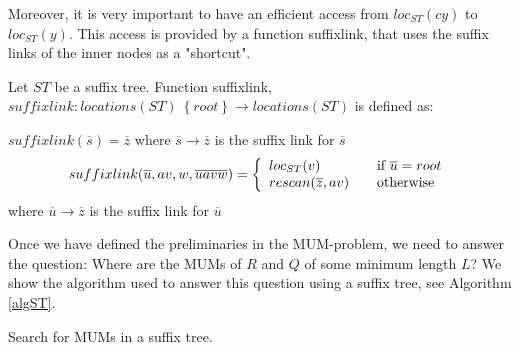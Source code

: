 \documentclass[conference]{IEEEtran}
\begin{document}
Moreover, it is very important to have an efficient access from $loc_{ST}(cy)$ to $loc_{ST}(y)$. This access is provided by a function suffixlink, that uses the suffix links of the inner nodes as a "shortcut".
\begin{mydef}
Let $ST$ be a suffix tree. Function suffixlink, $suffixlink:locations(ST)\ \left\lbrace root\right\rbrace\rightarrow locations(ST)$ is defined as:
\begin{center}
$suffixlink(\overline{s})=\overline{z}$
where $\overline{s}\rightarrow\overline{z}$ is the suffix link for $\overline{s}$
\[ suffixlink(\overline{u},av,w,\overline{uavw})= \left\{ 
  \begin{array}{l l}
    loc_{ST}(v) & \quad \text{if $\overline{u}=root$}\\
    rescan(\overline{z},av) & \quad \text{otherwise}
  \end{array} \right.\]
  where $\overline{u}\rightarrow \overline{z}$ is the suffix link for $\overline{u}$
\end{center}
\end{mydef}
Once we have defined the preliminaries in the MUM-problem, we need to answer the question: Where are the MUMs of $R$ and $Q$ of some minimum length $L$? We show the algorithm used to answer this question using a suffix tree, see Algorithm \ref{algST}.
\begin{algorithm}[]
  \label{algST}
  \Input{\R, \Q, \Len}
  \caption{Search for MUMs in a suffix tree.}
\end{algorithm}
\end{document}
